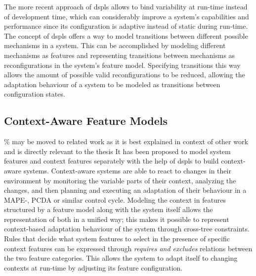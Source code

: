 The more recent approach of \glspl{dspl} \cite{Hallsteinsen2008} allows to bind variability at run-time instead of development time, which can considerably improve a system's capabilities and performance since its configuration is adaptive instead of static during run-time. 
The concept of \glspl{dspl} offers a way to model transitions between different possible mechanisms in a system. This can be accomplished by modeling different mechanisms as features and representing transitions between mechanisms as reconfigurations in the system's feature model. Specifying transitions this way allows the amount of possible valid reconfigurations to be reduced, allowing the adaptation behaviour of a system to be modeled as transitions between configuration states.%

\subsection{Context-Aware Feature Models} 
\% may be moved to related work as it is best explained in context of other work and is directly relevant to the thesis
It has been proposed \cite{Acher2009} \cite{Saller2013} \cite{Fernandes2008} to model system features and context features separately with the help of \glspl{dspl} to build context-aware systems. Context-aware systems are able to react to changes in their environment by monitoring the variable parts of their context, analyzing the changes, and then planning and executing an adaptation of their behaviour in a MAPE-, PCDA or similar control cycle. 
Modeling the context in features structured by a feature model along with the system itself allows the representation of both in a unified way; this makes it possible to represent context-based adaptation behaviour of the system through cross-tree constraints. Rules that decide what system features to select in the presence of specific context features can be expressed through \textit{requires and excludes} relations between the two feature categories. This allows the system to adapt itself to changing contexts at run-time by adjusting its feature configuration.


